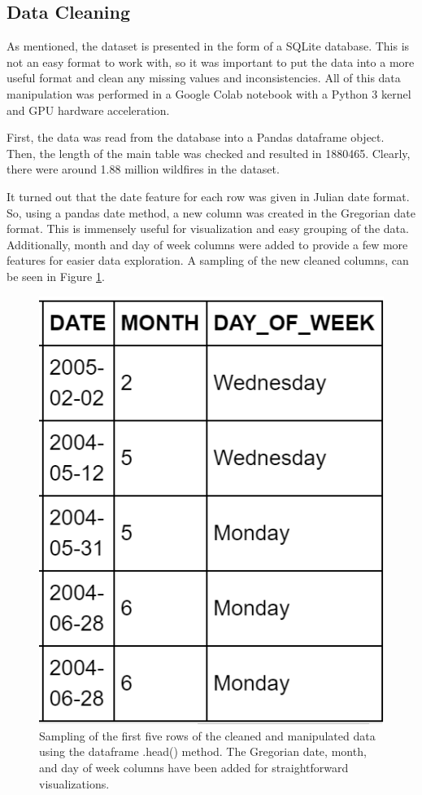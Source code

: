 \documentclass[conference]{IEEEtran}
\begin{document}
\subsection{Data Cleaning}
As mentioned, the dataset is presented in the form of a SQLite database. This is not an easy format to work with, so it was important to put the data into a more useful format and clean any missing values and inconsistencies. All of this data manipulation was performed in a Google Colab notebook with a Python 3 kernel and GPU hardware acceleration. \par

First, the data was read from the database into a Pandas dataframe object. Then, the length of the main table was checked and resulted in 1880465. Clearly, there were around 1.88 million wildfires in the dataset. \par

It turned out that the date feature for each row was given in Julian date format. So, using a pandas date method, a new column was created in the Gregorian date format. This is immensely useful for visualization and easy grouping of the data. Additionally, month and day of week columns were added to provide a few more features for easier data exploration. A sampling of the new cleaned columns, can be seen in Figure \ref{fig:cleaned_data}. \par

\begin{figure}
    \centering
    \includegraphics[scale=0.6]{img/cleaned_data.PNG}
    \caption{Sampling of the first five rows of the cleaned and manipulated data using the dataframe .head() method. The Gregorian date, month, and day of week columns have been added for straightforward visualizations.}
    \label{fig:cleaned_data}
\end{figure}
\end{document}
